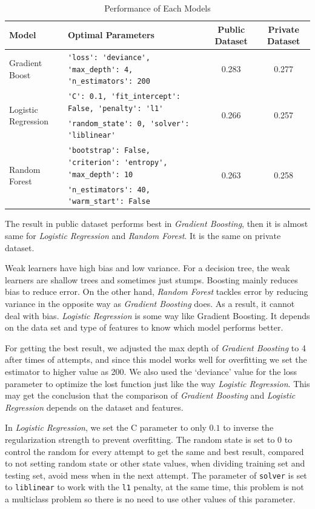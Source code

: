 \documentclass{standalone}
\begin{document}
{\begin{table}[!t]
\centering
\caption{Performance of Each Models}\label{performance}
\begin{tabular}{llcc}
\toprule
\bfseries Model & \bfseries Optimal Parameters &Public Dataset & Private Dataset\\\midrule
Gradient Boost & \verb|'loss': 'deviance', 'max_depth': 4, 'n_estimators': 200| & 0.283 & 0.277  \\\hline
\multirow{2}{*}{Logistic Regression} & \verb|'C': 0.1, 'fit_intercept': False, 'penalty': 'l1'| & \multirow{2}{*}{0.266} & \multirow{2}{*}{0.257}  \\
& \verb|'random_state': 0, 'solver': 'liblinear'| &  & \\\hline
\multirow{2}{*}{Random Forest} & \verb|'bootstrap': False, 'criterion': 'entropy', 'max_depth': 10| & \multirow{2}{*}{0.263} & \multirow{2}{*}{0.258} \\
& \verb|'n_estimators': 40, 'warm_start': False| &&\\\bottomrule
\end{tabular}
\end{table}

The result in public dataset performs best in \emph{Gradient Boosting}, then it is almost same for \emph{Logistic Regression} and \emph{Random Forest}. It is the same on private dataset.

Weak learners have high bias and low variance. For a decision tree, the weak learners are shallow trees and sometimes just stumps. Boosting mainly reduces bias to reduce error. On the other hand, \emph{Random Forest} tackles error by reducing variance in the opposite way as \emph{Gradient Boosting} does. As a result, it cannot deal with bias.
\emph{Logistic Regression} is some way like Gradient Boosting. It depends on the data set and type of features to know which model performs better.

For getting the best result, we adjusted the max depth of \emph{Gradient Boosting} to 4 after times of attempts, and since this model works well for overfitting we set the estimator to higher value as 200. We also used the `deviance' value for the loss parameter to optimize the lost function just like the way \emph{Logistic Regression}. This may get the conclusion that the comparison of \emph{Gradient Boosting} and \emph{Logistic Regression} depends on the dataset and features.

In \emph{Logistic Regression}, we set the C parameter to only $0.1$ to inverse the regularization strength to prevent overfitting. The random state is set to $0$ to control the random for every attempt to get the same and best result, compared to not setting random state or other state values, when dividing training set and testing set, avoid mess when in the next attempt. The parameter of \verb|solver| is set to \verb|liblinear| to work with the \verb|l1| penalty, at the same time, this problem is not a multiclass problem so there is no need to use other values of this parameter.

}
\end{document}
